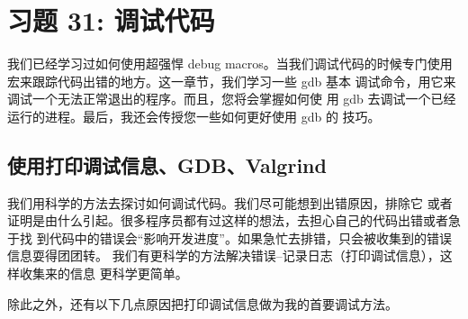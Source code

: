 \chapter{习题 31: 调试代码}

我们已经学习过如何使用超强悍 debug macros。当我们调试代码的时候专门使用
宏来跟踪代码出错的地方。这一章节，我们学习一些 gdb 基本
调试命令，用它来调试一个无法正常退出的程序。而且，您将会掌握如何使
用 gdb 去调试一个已经运行的进程。最后，我还会传授您一些如何更好使用 gdb 的
技巧。

\section{使用打印调试信息、GDB、Valgrind}

我们用科学的方法去探讨如何调试代码。我们尽可能想到出错原因，排除它
或者证明是由什么引起。很多程序员都有过这样的想法，去担心自己的代码出错或者急于找
到代码中的错误会“影响开发进度”。如果急忙去排错，只会被收集到的错误信息耍得团团转。
我们有更科学的方法解决错误--记录日志（打印调试信息），这样收集来的信息
更科学更简单。

除此之外，还有以下几点原因把打印调试信息做为我的首要调试方法。

